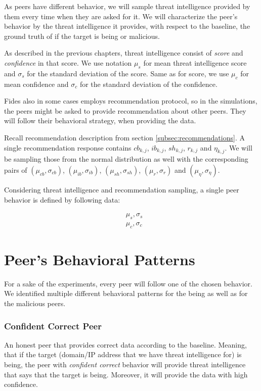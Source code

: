 As peers have different behavior, we will sample threat intelligence provided by them every time when they are asked for it.
We will characterize the peer's behavior by the threat intelligence it provides, with respect to the baseline, the ground truth of if the target is being or malicious.

As described in the previous chapters, threat intelligence consist of \textit{score} and \textit{confidence} in that score.
We use notation $\mu_{s}$ for mean threat intelligence score and $\sigma_{s}$ for the standard deviation of the score. 
Same as for score, we use $\mu_{c}$ for mean confidence and $\sigma_{c}$ for the standard deviation of the confidence. 

Fides also in some cases employs recommendation protocol, so in the simulations, the peers might be asked to provide recommendation about other peers.
They will follow their behavioral strategy, when providing the data. 

Recall recommendation description from section \ref{subsec:recommendations}. A single recommendation response contains $cb_{k,j}$, $ib_{k,j}$, $sh_{k,j}$, $r_{k,j}$ and $\eta_{k,j}$. 
We will be sampling those from the normal distribution as well with the corresponding pairs of $(\mu_{cb}, \sigma_{cb})$, $(\mu_{ib}, \sigma_{ib})$, $(\mu_{sh}, \sigma_{sh})$, $(\mu_{r}, \sigma_{r})$ and $(\mu_{\eta}, \sigma_{\eta})$.

Considering threat intelligence and recommendation sampling, a single peer behavior is defined by following data:

\begin{equation}
\begin{split}
    &\mu_{s}, \sigma_{s} \\
    &\mu_{c}, \sigma_{c}
\end{split}
\end{equation}

\section{Peer's Behavioral Patterns}
\label{sec:peers-behavioral-patterns}
For a sake of the experiments, every peer will follow one of the chosen behavior. 
We identified multiple different behavioral patterns for the being as well as for the malicious peers.

\subsubsection{Confident Correct Peer}
An honest peer that provides correct data according to the baseline. Meaning, that if the target (domain/IP address that we have threat intelligence for) is being, the peer with \textit{confident correct} behavior will provide threat intelligence that says that the target is being. 
Moreover, it will provide the data with high confidence.

